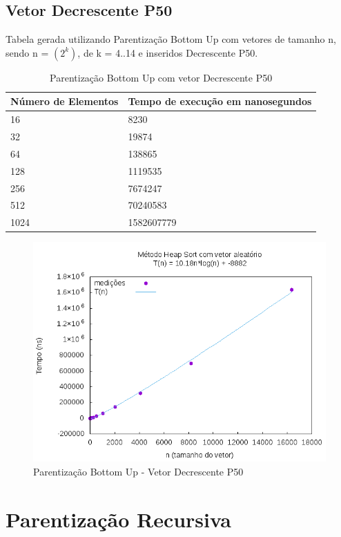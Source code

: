 \documentclass[12pt,a4paper,twoside]{report}
\begin{document}
\subsection{Vetor Decrescente P50}
Tabela gerada utilizando Parentização Bottom Up com vetores de tamanho n, sendo n = $(2^k)$, de k = 4..14 e inseridos Decrescente P50.
\begin{table}[H]
\centering
\caption{Parentização Bottom Up com vetor Decrescente P50}
\label{my-label}
\begin{tabular}{|l|l|}
\hline
\multicolumn{1}{|c|}{\textbf{Número de Elementos}} & \multicolumn{1}{c|}{\textbf{Tempo de execução em nanosegundos}} \\ \hline
16 & 8230 \\ \hline
32 & 19874 \\ \hline
64 & 138865 \\ \hline
128 & 1119535 \\ \hline
256 & 7674247 \\ \hline
512 & 70240583 \\ \hline
1024 & 1582607779 \\ \hline
\end{tabular}
\end{table}

\begin{figure}[H]
    \centering
    \includegraphics[width=0.7\linewidth]{graficos/HeapSort/vIntAleatorio/vIntAleatorio.png}
  \caption{Parentização Bottom Up - Vetor Decrescente P50}
\end{figure}






\section{Parentização Recursiva}
\end{document}
